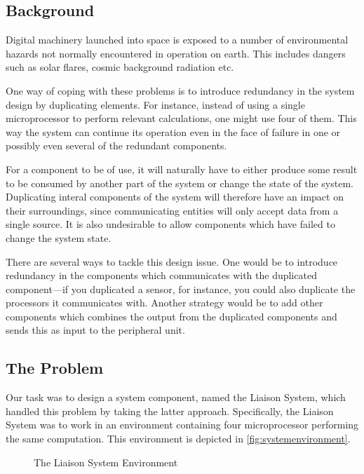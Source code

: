 \subsection{Background}
Digital machinery launched into space is exposed to a number of
environmental hazards not normally encountered in operation on
earth. This includes dangers such as solar flares, cosmic background
radiation etc.\cite{nasa}

One way of coping with these problems is to introduce redundancy in
the system design by duplicating elements. For instance, instead of
using a single microprocessor to perform relevant calculations, one
might use four of them. This way the system can continue its operation
even in the face of failure in one or possibly even several of the
redundant components.

For a component to be of use, it will naturally have to either produce
some result to be consumed by another part of the system or change the
state of the system. Duplicating interal components of the system will
therefore have an impact on their surroundings, since communicating
entities will only accept data from a single source. It is also
undesirable to allow components which have failed to change the system
state.

There are several ways to tackle this design issue. One would be to
introduce redundancy in the components which communicates with the
duplicated component---if you duplicated a sensor, for instance, you
could also duplicate the processors it communicates with. Another
strategy would be to add other components which combines the output
from the duplicated components and sends this as input to the
peripheral unit.

\subsection{The Problem}

Our task was to design a system component, named the Liaison System,
which handled this problem by taking the latter
approach. Specifically, the Liaison System was to work in an
environment containing four microprocessor performing the same
computation. This environment is depicted in
\autoref{fig:systemenvironment}. 

\begin{figure}
    \caption{The Liaison System Environment}
    \label{fig:systemenvironment}
\end{figure}

